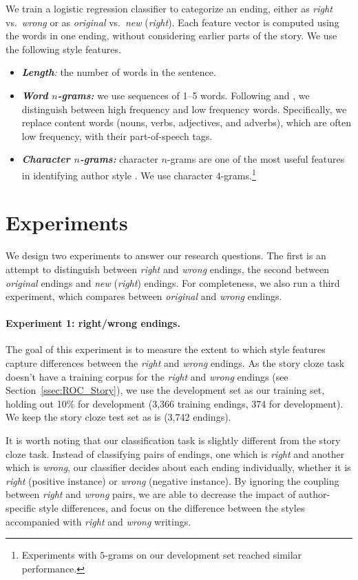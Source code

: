 \documentclass[11pt,a4paper]{article}
\newcommand{\secref}[1]{Section~\ref{ssec:#1}}
\newcommand{\isectionb}[1]{\section{#1}\label{ssec:#1}}
\newcommand{\resolved}[1]{}
\newcommand{\roy}[1]{{\color{orange}\textsc{[#1 --rs]}}}
\newcommand{\nascomment}[1]{{\color{blue}\textsc{[#1 --nas]}}}
\renewcommand{\roy}[1]{{\color{orange}[#1 --rs]}}
\renewcommand{\roy}[1]{#1}
\renewcommand{\nascomment}[1]{}
\begin{document}
We train a logistic regression classifier to categorize an ending,
either as {\it right} vs.~{\it wrong} or as {\it original} vs.~{\it new} ({\it right}).
Each feature vector is computed using the words in one ending, without considering earlier parts of the story. 
We use the following style features.

\begin{itemize}
\item\textit{\textbf{Length}:} the number of words in the sentence.
\item\textit{\textbf{Word $n$-grams:}} we use sequences of 1--5
  words. Following \citet{Tsur:2010} and \citet{Schwartz:2013}, we distinguish between high frequency and low frequency words. 
Specifically, we replace content words (nouns, verbs, adjectives, and adverbs), which are often low frequency, with their part-of-speech tags.
\item\textit{\textbf{Character $n$-grams:}} character $n$-grams are one of the most useful features in identifying author style \cite{Stamatatos:2009}. 
We use character $4$-grams.\footnote{\roy{Experiments with $5$-grams on our development set reached similar performance.}}
\end{itemize}

\isectionb{Experiments}
We design two experiments to answer our research questions. 
The first is an attempt to distinguish between {\it right} and {\it wrong} endings,
the second  between {\it original} endings and {\it new} ({\it right}) endings.
For completeness, we also run a third experiment, which compares between {\it original} and {\it wrong} endings. 


\paragraph{Experiment 1: right/wrong endings.}
The goal of this experiment is to measure the extent to which  style features capture differences between the {\it right} and {\it wrong} endings.
As the story cloze task doesn't have a training corpus for the {\it
  right} and {\it wrong} endings (see \secref{ROC_Story}), we use the
development set as our training set, holding out 10\% for development
(3,366 training endings, 374 for development). 
 We keep the story cloze test set as is (3,742 endings).

It is worth noting that our classification task is slightly different from the story cloze task. 
Instead of classifying pairs of endings, one which is {\it right} and
another which is {\it wrong}, our classifier decides about each ending
individually, whether it is \emph{right} (positive instance) or
\emph{wrong} (negative instance).
By ignoring the coupling between {\it right} and {\it wrong} pairs, 
we are able to decrease the impact of author-specific style differences,
and focus on the difference between the styles accompanied with {\it right} and {\it wrong} writings.
\resolved{we
are able make a more general claim about the style used when writing
each of the tasks \nascomment{I'm not sure I follow this sentence; can
we be more clear?}.}
\end{document}
